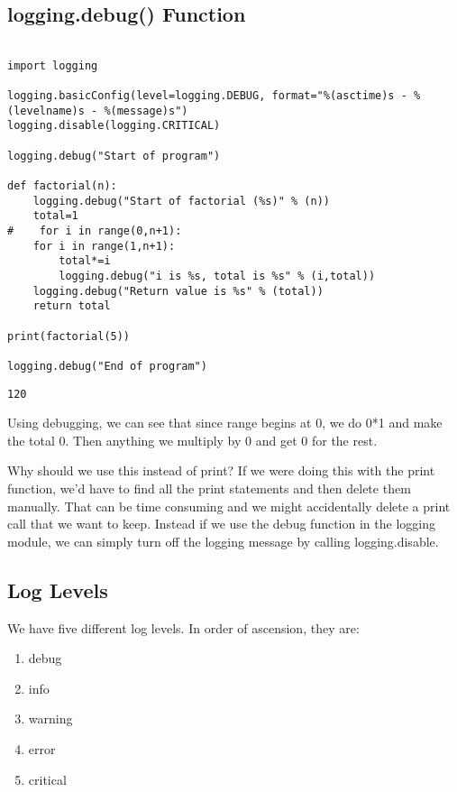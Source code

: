 \documentclass[11pt]{article}
\begin{document}
\subsection{logging.debug() Function}
\label{sec:orgc4d86ca}

\begin{verbatim}

import logging

logging.basicConfig(level=logging.DEBUG, format="%(asctime)s - %(levelname)s - %(message)s")
logging.disable(logging.CRITICAL)

logging.debug("Start of program")

def factorial(n):
    logging.debug("Start of factorial (%s)" % (n))
    total=1
#    for i in range(0,n+1):
    for i in range(1,n+1):
        total*=i
        logging.debug("i is %s, total is %s" % (i,total))
    logging.debug("Return value is %s" % (total))
    return total

print(factorial(5))

logging.debug("End of program")

\end{verbatim}

\begin{verbatim}
120
\end{verbatim}


Using debugging, we can see that since range begins at 0, we do 0*1 and make the total 0. Then anything we multiply by 0 and get 0 for the rest.

Why should we use this instead of print? If we were doing this with the print function, we'd have to find all the print statements and then delete them manually. That can be time consuming and we might accidentally delete a print call that we want to keep. Instead if we use the debug function in the logging module, we can simply turn off the logging message by calling logging.disable.

\subsection{Log Levels}
\label{sec:org9cba08d}

We have five different log levels. In order of ascension, they are:

\begin{enumerate}
\item debug
\item info
\item warning
\item error
\item critical
\end{enumerate}
\end{document}
